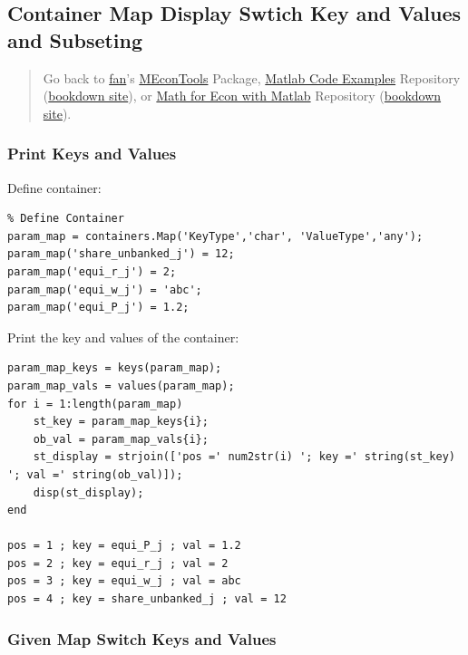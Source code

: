 \documentclass[
]{book}
\begin{document}
\hypertarget{container-map-display-swtich-key-and-values-and-subseting}{%
\subsection{Container Map Display Swtich Key and Values and Subseting}\label{container-map-display-swtich-key-and-values-and-subseting}}

\begin{quote}
Go back to \href{http://fanwangecon.github.io/}{fan}'s \href{https://fanwangecon.github.io/MEconTools/}{MEconTools} Package, \href{https://fanwangecon.github.io/M4Econ/}{Matlab Code Examples} Repository (\href{https://fanwangecon.github.io/M4Econ/bookdown}{bookdown site}), or \href{https://fanwangecon.github.io/Math4Econ/}{Math for Econ with Matlab} Repository (\href{https://fanwangecon.github.io/Math4Econ/bookdown}{bookdown site}).
\end{quote}

\hypertarget{print-keys-and-values}{%
\subsubsection{Print Keys and Values}\label{print-keys-and-values}}

Define container:

\begin{verbatim}
% Define Container
param_map = containers.Map('KeyType','char', 'ValueType','any');
param_map('share_unbanked_j') = 12;
param_map('equi_r_j') = 2;
param_map('equi_w_j') = 'abc';
param_map('equi_P_j') = 1.2;
\end{verbatim}

Print the key and values of the container:

\begin{verbatim}
param_map_keys = keys(param_map);
param_map_vals = values(param_map);
for i = 1:length(param_map)
    st_key = param_map_keys{i};
    ob_val = param_map_vals{i};
    st_display = strjoin(['pos =' num2str(i) '; key =' string(st_key) '; val =' string(ob_val)]);
    disp(st_display);
end

pos = 1 ; key = equi_P_j ; val = 1.2
pos = 2 ; key = equi_r_j ; val = 2
pos = 3 ; key = equi_w_j ; val = abc
pos = 4 ; key = share_unbanked_j ; val = 12
\end{verbatim}

\hypertarget{given-map-switch-keys-and-values}{%
\subsubsection{Given Map Switch Keys and Values}\label{given-map-switch-keys-and-values}}
\end{document}
